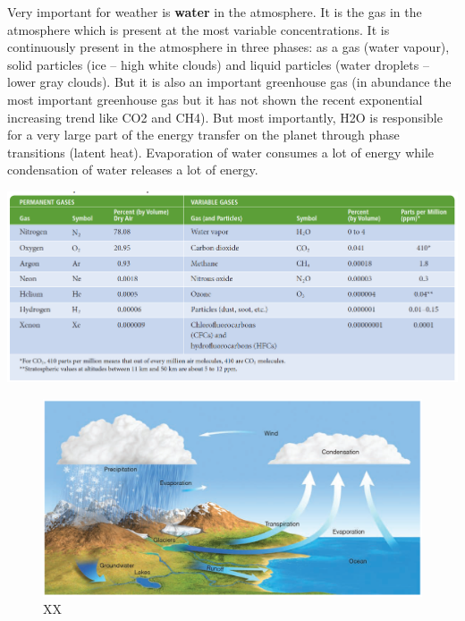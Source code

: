 \documentclass[oneside]{book}
\begin{document}
Very important for weather is \textbf{water} in the atmosphere. It is
the gas in the atmosphere which is present at the most variable
concentrations. It is continuously present in the atmosphere in three
phases: as a gas (water vapour), solid particles (ice -- high white
clouds) and liquid particles (water droplets -- lower gray clouds). But
it is also an important greenhouse gas (in abundance the most important
greenhouse gas but it has not shown the recent exponential increasing
trend like CO2 and CH4). But most importantly, H2O is responsible for a
very large part of the energy transfer on the planet through phase
transitions (latent heat). Evaporation of water consumes a lot of energy
while condensation of water releases a lot of energy.

\pagebreak

\begin{center}
\label{table:example}

\begin{center}\includegraphics[width=0.8\linewidth]{figures/Table11} \end{center}
\end{center}

\begin{figure}

{\centering \includegraphics[width=0.8\linewidth]{figures/Figure11} 

}

\caption{XX}\label{fig:intro}
\end{figure}
\end{document}
